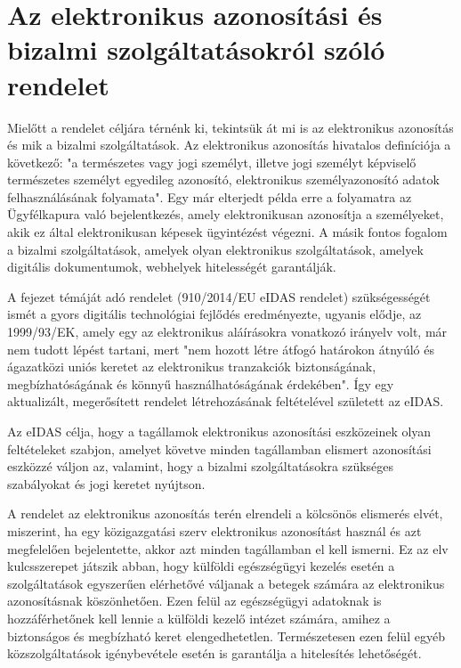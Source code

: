 \section{Az elektronikus azonosítási és bizalmi szolgáltatásokról szóló rendelet}

Mielőtt a rendelet céljára térnénk ki, tekintsük át mi is az elektronikus azonosítás és mik a bizalmi szolgáltatások. Az elektronikus azonosítás hivatalos definíciója a következő: "a természetes vagy jogi személyt, illetve jogi személyt képviselő természetes személyt egyedileg azonosító, elektronikus személyazonosító adatok felhasználásának folyamata". \cite{eIDAS} Egy már elterjedt példa erre a folyamatra az Ügyfélkapura való bejelentkezés, amely elektronikusan azonosítja a személyeket, akik ez által elektronikusan képesek ügyintézést végezni. A másik fontos fogalom a bizalmi szolgáltatások, amelyek olyan elektronikus szolgáltatások, amelyek digitális dokumentumok, webhelyek hitelességét garantálják.

A fejezet témáját adó rendelet (910/2014/EU eIDAS rendelet) szükségességét ismét a gyors digitális technológiai fejlődés eredményezte, ugyanis elődje, az 1999/93/EK, amely egy az elektronikus aláírásokra vonatkozó irányelv volt, már nem tudott lépést tartani, mert "nem hozott létre átfogó határokon átnyúló és ágazatközi uniós keretet az elektronikus tranzakciók biztonságának, megbízhatóságának és könnyű használhatóságának érdekében". Így egy aktualizált, megerősített rendelet létrehozásának feltételével született az eIDAS.

Az eIDAS célja, hogy a tagállamok elektronikus azonosítási eszközeinek olyan feltételeket szabjon, amelyet követve minden tagállamban elismert azonosítási eszközzé váljon az, valamint, hogy a bizalmi szolgáltatásokra szükséges szabályokat és jogi keretet nyújtson.

A rendelet az elektronikus azonosítás terén elrendeli a kölcsönös elismerés elvét, miszerint, ha egy közigazgatási szerv elektronikus azonosítást használ és azt megfelelően bejelentette, akkor azt minden tagállamban el kell ismerni. Ez az elv kulcsszerepet játszik abban, hogy külföldi egészségügyi kezelés esetén a szolgáltatások egyszerűen elérhetővé váljanak a betegek számára az elektronikus azonosításnak köszönhetően. Ezen felül az egészségügyi adatoknak is hozzáférhetőnek kell lennie a külföldi kezelő intézet számára, amihez a biztonságos és megbízható keret elengedhetetlen. Természetesen ezen felül egyéb közszolgáltatások igénybevétele esetén is garantálja a hitelesítés lehetőségét.

